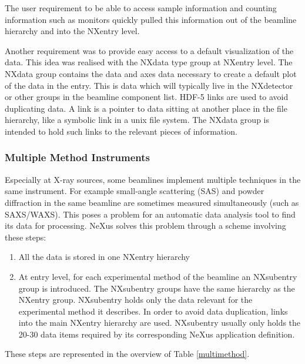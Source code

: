 \documentclass[%
 aip,
rsi,
 amsmath,amssymb,
 reprint,%
]{revtex4-1}
\begin{document}
The user requirement to be able to access sample information and counting information such as monitors quickly 
pulled this information out of the beamline hierarchy and into the NXentry level.

Another requirement was to provide easy access to a default visualization of the data. This idea was realised with the 
NXdata type group at NXentry level. The NXdata group contains the data and axes data necessary to create a default plot of 
the data in the entry. This is data which will typically live in the NXdetector or other groups in the 
beamline component list. HDF-5 links are used to avoid duplicating data. A link 
is a pointer to data sitting at another place in the file hierarchy, like a symbolic link in a unix 
file system.  The NXdata group is intended to hold such links to the relevant pieces of information.

\subsubsection{Multiple Method Instruments}

Especially at X-ray sources, some beamlines implement multiple techniques in the same instrument. 
For example small-angle scattering (SAS) and powder diffraction in the same beamline are sometimes measured 
simultaneously (such as SAXS/WAXS). This poses a problem for an automatic data analysis tool to find its data 
for processing.  NeXus solves this problem through a scheme involving these steps:
\begin{enumerate}
\item All the data is stored in one NXentry hierarchy
\item At entry level, for each experimental method of the beamline an NXsubentry group is introduced. The 
  NXsubentry groups have the same hierarchy as the  NXentry group. NXsubentry holds only the data relevant 
  for the experimental method it describes. In order to avoid data duplication, links into the main NXentry 
  hierarchy are used. 
  NXsubentry usually only holds the 20-30 data items required by its corresponding NeXus 
  application definition.  
\end{enumerate} 
These steps are represented in the overview of Table \ref{multimethod}.
\end{document}
